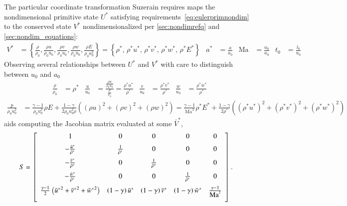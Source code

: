\documentclass[letterpaper,11pt,nointlimits,reqno,draft]{amsbook}
\newcommand{\Mach}[1][]{\ensuremath{\mbox{Ma}_{#1}}}
\begin{document}
The particular coordinate transformation Suzerain requires maps the
nondimensional primitive state $U^*$ satisfying
requirements~\eqref{eq:eulerprimnondim} to the conserved state $V^*$
nondimensionalized per \autoref{sec:nondimrefq} and
\autoref{sec:nondim_equations}:
\begin{align}
\label{eq:eulerconsnondim}
V^{*}
&= \left\{
  \frac{\rho}{\rho_0},
  \frac{\rho u}{\rho_0 u_0},
  \frac{\rho v}{\rho_0 u_0},
  \frac{\rho w}{\rho_0 u_0},
  \frac{\rho E}{\rho_0 a_0^2}
\right\}
= \left\{
    \rho^{*},
  \,\rho^{*} u^{*},
  \,\rho^{*} v^{*},
  \,\rho^{*} w^{*},
  \,\rho^{*} E^{*}
\right\}
&
a^{*} &= \frac{a}{a_0}
&
\Mach &= \frac{u_0}{a_0}
&
t_0 &= \frac{l_0}{u_0}
\end{align}
Observing several relationships between $U^*$ and $V^*$ with care to
distinguish between $u_0$ and $a_0$
\begin{align}
  \frac{\rho}{\rho_0} &= \rho^*
&
  \frac{u}{u_0} &=
  \frac{\frac{\rho{}u}{\rho_0u_0}}{\frac{\rho}{\rho_0}}
  =
  \frac{\rho^{*}u^{*}}{\rho^{*}}
&
  \frac{v}{u_0} &= \frac{\rho^{*}v^*}{\rho^*}
&
  \frac{w}{u_0} &= \frac{\rho^{*}w^*}{\rho^*}
\end{align}
\begin{align}
 \frac{p}{\rho_0 u_0^2}
&=
   \frac{\gamma-1}{\rho_0 u_0^2} \rho E
 + \frac{1-\gamma}{2 \rho_0 u_0^2 \rho}\left(
           \left(\rho{}u\right)^2
         + \left(\rho{}v\right)^2
         + \left(\rho{}w\right)^2
   \right)
=
   \frac{\gamma-1}{\Mach^2} \rho^{*} E^{*}
 + \frac{1-\gamma}{2 \rho^{*}}\left(
           \left(\rho^{*}u^{*}\right)^2
         + \left(\rho^{*}v^{*}\right)^2
         + \left(\rho^{*}w^{*}\right)^2
   \right)
\end{align}
aids computing the Jacobian matrix evaluated at some $\bar{V}^{*}$,
\begin{align}
S &= \left[\begin{array}{ccccc}
    1      %
  & 0      %
  & 0      %
  & 0      %
  & 0      %
  \\ \noalign{\medskip}
    - \frac{\bar{u}^*}{\bar{\rho}^*} %
  & \frac{1}{\bar{\rho}^*}           %
  & 0                                %
  & 0                                %
  & 0                                %
  \\ \noalign{\medskip}
    - \frac{\bar{v}^*}{\bar{\rho}^*} %
  & 0                                %
  & \frac{1}{\bar{\rho}^*}           %
  & 0                                %
  & 0                                %
  \\ \noalign{\medskip}
    - \frac{\bar{w}^*}{\bar{\rho}^*} %
  & 0                                %
  & 0                                %
  & \frac{1}{\bar{\rho}^*}           %
  & 0                                %
  \\ \noalign{\medskip}
    \frac{\gamma-1}{2}\left({\bar{u}^*}^2+{\bar{v}^*}^2+{\bar{w}^*}^2\right) %
  & \left(1 - \gamma\right) \bar{u}^*   %
  & \left(1 - \gamma\right) \bar{v}^*   %
  & \left(1 - \gamma\right) \bar{w}^*   %
  & \frac{\gamma-1}{\Mach^2}            %
  \\ \noalign{\medskip}
\end{array}\right]
.
\end{align}
\end{document}
